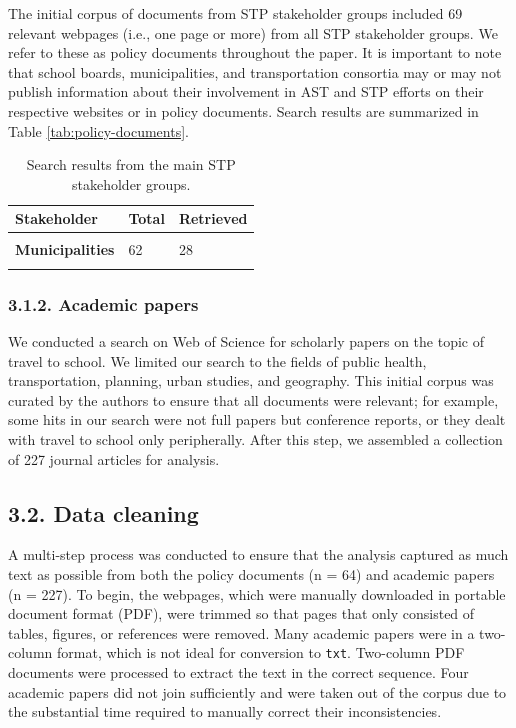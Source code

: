 \documentclass[]{elsarticle} %
\begin{document}
The initial corpus of documents from STP stakeholder groups included 69
relevant webpages (i.e., one page or more) from all STP stakeholder
groups. We refer to these as policy documents throughout the paper. It
is important to note that school boards, municipalities, and
transportation consortia may or may not publish information about their
involvement in AST and STP efforts on their respective websites or in
policy documents. Search results are summarized in Table
\ref{tab:policy-documents}.

\begin{table}

\caption{\label{tab:policy-documents}\label{tab:search-results}Search results from the main STP stakeholder groups.}
\centering
\begin{tabular}[t]{>{}l|l|>{}l}
\toprule
Stakeholder & Total & Retrieved\\
\midrule
\cellcolor{gray!6}{\textbf{School boards}} & \cellcolor{gray!6}{62} & \cellcolor{gray!6}{32}\\
\textbf{Municipalities} & 62 & 28\\
\cellcolor{gray!6}{\textbf{Transportation consortia}} & \cellcolor{gray!6}{39} & \cellcolor{gray!6}{9}\\
\bottomrule
\end{tabular}
\end{table}

\hypertarget{academic-papers}{%
\subsubsection{3.1.2. Academic papers}\label{academic-papers}}

We conducted a search on Web of Science for scholarly papers on the
topic of travel to school. We limited our search to the fields of public
health, transportation, planning, urban studies, and geography. This
initial corpus was curated by the authors to ensure that all documents
were relevant; for example, some hits in our search were not full papers
but conference reports, or they dealt with travel to school only
peripherally. After this step, we assembled a collection of 227 journal
articles for analysis.

\hypertarget{data-cleaning}{%
\subsection{3.2. Data cleaning}\label{data-cleaning}}

A multi-step process was conducted to ensure that the analysis captured
as much text as possible from both the policy documents (n = 64) and
academic papers (n = 227). To begin, the webpages, which were manually
downloaded in portable document format (PDF), were trimmed so that pages
that only consisted of tables, figures, or references were removed. Many
academic papers were in a two-column format, which is not ideal for
conversion to \texttt{txt}. Two-column PDF documents were processed to
extract the text in the correct sequence. Four academic papers did not
join sufficiently and were taken out of the corpus due to the
substantial time required to manually correct their inconsistencies.
\end{document}
